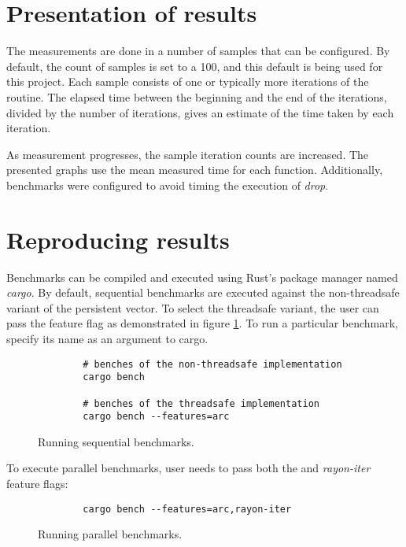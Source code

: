 \section{Presentation of results}
The measurements are done in a number of samples that can be configured. By default, the count of samples is set to a 100, and this default is being used for this project. Each sample consists of one or typically more iterations of the routine. The elapsed time between the beginning and the end of the iterations, divided by the number of iterations, gives an estimate of the time taken by each iteration.

As measurement progresses, the sample iteration counts are increased. The presented graphs use the mean measured time for each function. Additionally, benchmarks were configured to avoid timing the execution of \emph{drop}.

\section{Reproducing results}
Benchmarks can be compiled and executed using Rust's package manager named \emph{cargo}. By default, sequential benchmarks are executed against the non-threadsafe variant of the persistent vector. To select the threadsafe variant, the user can pass the \arc{} feature flag as demonstrated in figure \ref{fig:sequential-benches}. To run a particular benchmark, specify its name as an argument to cargo.

\begin{figure}[!htbp]
    \centering

    \begin{verbatim}
        # benches of the non-threadsafe implementation
        cargo bench

        # benches of the threadsafe implementation
        cargo bench --features=arc
    \end{verbatim}

    \caption{Running sequential benchmarks.}
    \label{fig:sequential-benches}
\end{figure}

To execute parallel benchmarks, user needs to pass both the \arc{} and \emph{rayon-iter} feature flags:

\begin{figure}[!htbp]
    \centering

    \begin{verbatim}
        cargo bench --features=arc,rayon-iter
    \end{verbatim}

    \caption{Running parallel benchmarks.}
    \label{fig:parallel-benches}
\end{figure}

